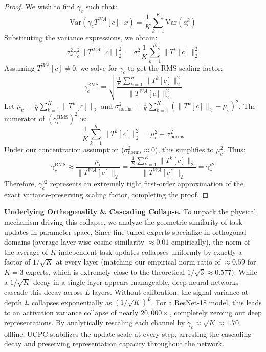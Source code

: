 \documentclass{article}
\theoremstyle{plain}
\theoremstyle{definition}
\theoremstyle{remark}
\begin{document}
\begin{proof}
  We wish to find $\gamma_c$ such that:
  \begin{equation}
    \text{Var}(\gamma_c T^{WA}[c] \cdot x) = \frac{1}{K} \sum_{k=1}^K \text{Var}(a_c^k)
  \end{equation}
  Substituting the variance expressions, we obtain:
  \begin{equation}
    \sigma_x^2 \gamma_c^2 \|T^{WA}[c]\|_2^2 = \sigma_x^2 \frac{1}{K} \sum_{k=1}^K \|T^k[c]\|_2^2
  \end{equation}
  Assuming $T^{WA}[c] \neq 0$, we solve for $\gamma_c$ to get the RMS scaling factor:
  \begin{equation}
    \gamma_c^{\text{RMS}} = \sqrt{\frac{\frac{1}{K}\sum_{k=1}^K \|T^k[c]\|_2^2}{\|T^{WA}[c]\|_2^2}}
  \end{equation}
  Let $\mu_c = \frac{1}{K}\sum_{k=1}^K \|T^k[c]\|_2$ and $\sigma_{\text{norms}}^2 = \frac{1}{K}\sum_{k=1}^K (\|T^k[c]\|_2 - \mu_c)^2$. The numerator of $(\gamma_c^{\text{RMS}})^2$ is:
  \begin{equation}
    \frac{1}{K}\sum_{k=1}^K \|T^k[c]\|_2^2 = \mu_c^2 + \sigma_{\text{norms}}^2
  \end{equation}
  Under our concentration assumption ($\sigma_{\text{norms}}^2 \approx 0$), this simplifies to $\mu_c^2$. Thus:
  \begin{equation}
    \gamma_c^{\text{RMS}} \approx \frac{\mu_c}{\|T^{WA}[c]\|_2} = \frac{\frac{1}{K}\sum_{k=1}^K \|T^k[c]\|_2}{\|T^{WA}[c]\|_2} = \gamma_c^{v2}
  \end{equation}
  Therefore, $\gamma_c^{v2}$ represents an extremely tight first-order approximation of the exact variance-preserving scaling factor, completing the proof.
\end{proof}

\textbf{Underlying Orthogonality \& Cascading Collapse.} To unpack the physical mechanism driving this collapse, we analyze the geometric similarity of task updates in parameter space. Since fine-tuned experts specialize in orthogonal domains (average layer-wise cosine similarity $\approx 0.01$ empirically), the norm of the average of $K$ independent task updates collapses uniformly by exactly a factor of $1/\sqrt{K}$ at every layer (matching our empirical norm ratio of $\approx 0.59$ for $K=3$ experts, which is extremely close to the theoretical $1/\sqrt{3} \approx 0.577$). While a $1/\sqrt{K}$ decay in a single layer appears manageable, deep neural networks cascade this decay across $L$ layers. Without calibration, the signal variance at depth $L$ collapses exponentially as $(1/\sqrt{K})^L$. For a ResNet-18 model, this leads to an activation variance collapse of nearly $20,000\times$, completely zeroing out deep representations. By analytically rescaling each channel by $\gamma_c \approx \sqrt{K} \approx 1.70$ offline, UCPC stabilizes the update scale at every step, arresting the cascading decay and preserving representation capacity throughout the network.
\end{document}

